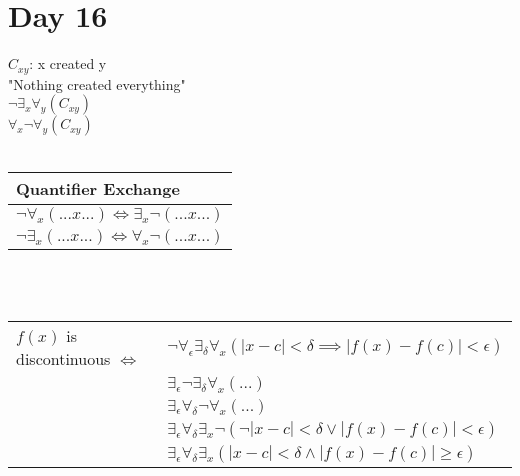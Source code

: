 \documentclass{article}
\begin{document}
	\section{Day 16}
	$C_{xy}$: x created y\\
	"Nothing created everything"\\
	$\lnot \exists _x \forall _y (C_{xy})$\\
	$\forall_x \lnot \forall _y (C_{xy})$\\
	\\
	\begin{tabular}{|l|}
		\hline Quantifier Exchange\\ \hline
		$\lnot \forall _x (...x...) \iff \exists _x \lnot (...x...)$\\
		$\lnot \exists _x (...x...) \iff \forall _x \lnot (...x...)$\\\hline
	\end{tabular}\\
	\\
	\begin{tabular}{l l}
		$f(x)$ is discontinuous $\iff$ & $\lnot \forall _{\epsilon} \exists _{\delta} \forall _x 	(|x-c| < \delta \implies |f(x) - f(c)| < \epsilon)$\\
		& $\exists _{\epsilon} \lnot \exists _{\delta} \forall _x (...)$\\
		& $\exists _{\epsilon} \forall _{\delta} \lnot \forall _x (...)$\\
		& $\exists _{\epsilon} \forall _{\delta} \exists _x \lnot (\lnot |x-c| < \delta \lor |f(x) - f(c)| < \epsilon)$\\
		& $\exists _{\epsilon} \forall _{\delta} \exists _x (|x-c| < \delta \land |f(x) - f(c)| \geq \epsilon)$\\
	\end{tabular}
\end{document}
